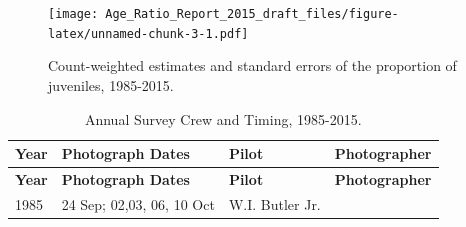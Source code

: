 \documentclass[]{article}
\begin{document}
\begin{figure}[htbp]
\centering
\texttt{[image: Age\_Ratio\_Report\_2015\_draft\_files/figure-latex/unnamed-chunk-3-1.pdf]}
\caption{Count-weighted estimates and standard errors of the proportion
of juveniles, 1985-2015.}
\end{figure}

 \newpage

\normalsize

\begin{longtable}[]{@{}llll@{}}
\caption{Annual Survey Crew and Timing, 1985-2015.}\tabularnewline
\toprule
\begin{minipage}[b]{0.12\columnwidth}\raggedright\strut
\textbf{Year}\strut
\end{minipage} & \begin{minipage}[b]{0.38\columnwidth}\raggedright\strut
\textbf{Photograph Dates}\strut
\end{minipage} & \begin{minipage}[b]{0.18\columnwidth}\raggedright\strut
\textbf{Pilot}\strut
\end{minipage} & \begin{minipage}[b]{0.20\columnwidth}\raggedright\strut
\textbf{Photographer}\strut
\end{minipage}\tabularnewline
\midrule
\endfirsthead
\toprule
\begin{minipage}[b]{0.12\columnwidth}\raggedright\strut
\textbf{Year}\strut
\end{minipage} & \begin{minipage}[b]{0.38\columnwidth}\raggedright\strut
\textbf{Photograph Dates}\strut
\end{minipage} & \begin{minipage}[b]{0.18\columnwidth}\raggedright\strut
\textbf{Pilot}\strut
\end{minipage} & \begin{minipage}[b]{0.20\columnwidth}\raggedright\strut
\textbf{Photographer}\strut
\end{minipage}\tabularnewline
\midrule
\endhead
\begin{minipage}[t]{0.12\columnwidth}\raggedright\strut
1985\strut
\end{minipage} & \begin{minipage}[t]{0.38\columnwidth}\raggedright\strut
24 Sep; 02,03, 06, 10 Oct\strut
\end{minipage} & \begin{minipage}[t]{0.18\columnwidth}\raggedright\strut
W.I. Butler Jr.\strut
\end{minipage} & \begin{minipage}[t]{0.20\columnwidth}\raggedright\strut

\end{minipage}
\end{longtable}
\end{document}
